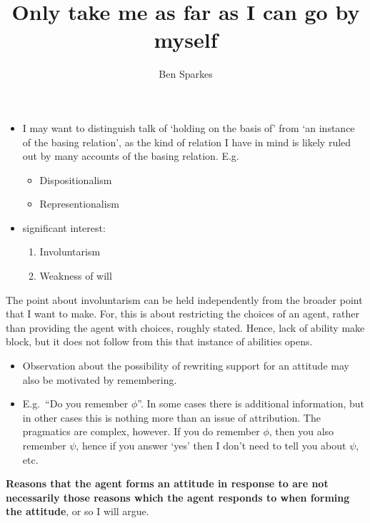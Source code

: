 \documentclass[10pt]{article}
\title{Only take me as far as I can go by myself}
\author{Ben Sparkes}
\newcommand{\hozlinedash}[0]{%
  \noindent\hdashrule[0.5ex][c]{\textwidth}{.1pt}{2.5pt}
}
\begin{document}
\tableofcontents

\hozlinedash

\begin{itemize}
\item I may want to distinguish talk of `holding on the basis of' from `an instance of the basing relation', as the kind of relation I have in mind is likely ruled out by many accounts of the basing relation.
  E.g.
  \begin{itemize}
  \item Dispositionalism
  \item Representionalism
  \end{itemize}
\end{itemize}

\begin{itemize}
\item significant interest:
  \begin{enumerate}
  \item Involuntarism
  \item Weakness of will
  \end{enumerate}
\end{itemize}

\begin{note}
  The point about involuntarism can be held independently from the broader point that I want to make.
  For, this is about restricting the choices of an agent, rather than providing the agent with choices, roughly stated.
  Hence, lack of ability make block, but it does not follow from this that instance of abilities opens.
\end{note}

\begin{itemize}
\item Observation about the possibility of rewriting support for an attitude may also be motivated by remembering.
\item E.g.\ ``Do you remember \(\phi\)''.
  In some cases there is additional information, but in other cases this is nothing more than an issue of attribution.
  The pragmatics are complex, however.
  If you do remember \(\phi\), then you also remember \(\psi\), hence if you answer `yes' then I don't need to tell you about \(\psi\), etc.
\end{itemize}

\newpage

\textbf{Reasons that the agent forms an attitude in response to are not necessarily those reasons which the agent responds to when forming the attitude}, or so I will argue.
\end{document}

